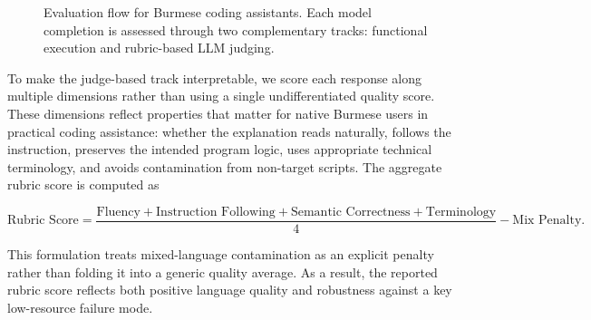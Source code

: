 \documentclass[11pt]{article}
\begin{document}
\begin{figure}[H]
\centering
{}
\caption{Evaluation flow for Burmese coding assistants. Each model completion is assessed through two complementary tracks: functional execution and rubric-based LLM judging.}
\label{fig:eval_flow}
\end{figure}

To make the judge-based track interpretable, we score each response along multiple dimensions rather than using a single undifferentiated quality score. These dimensions reflect properties that matter for native Burmese users in practical coding assistance: whether the explanation reads naturally, follows the instruction, preserves the intended program logic, uses appropriate technical terminology, and avoids contamination from non-target scripts. The aggregate rubric score is computed as

\begin{equation}
\text{Rubric Score} =
\frac{
\text{Fluency} +
\text{Instruction Following} +
\text{Semantic Correctness} +
\text{Terminology}
}{4}
- \text{Mix Penalty}.
\label{eq:rubric_score}
\end{equation}

This formulation treats mixed-language contamination as an explicit penalty rather than folding it into a generic quality average. As a result, the reported rubric score reflects both positive language quality and robustness against a key low-resource failure mode.
\end{document}
